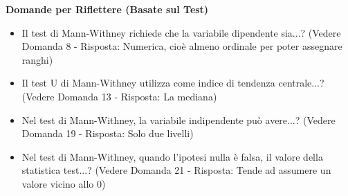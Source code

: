 \documentclass[12pt, a4paper]{article}
\newenvironment{reflectionbox}{%
    \medskip
    \begin{framed}\par\noindent
    \textbf{\color{boxtitlecolor}Domande per Riflettere (Basate sul Test)} \par
    \begin{itemize}[leftmargin=*, label=$\blacktriangleright$]
}{%
    \end{itemize}\par
    \end{framed}
    \medskip
}
\begin{document}
\begin{reflectionbox}
    \item Il test di Mann-Withney richiede che la variabile dipendente sia...? (Vedere Domanda 8 - Risposta: Numerica, cioè almeno ordinale per poter assegnare ranghi)
    \item Il test U di Mann-Withney utilizza come indice di tendenza centrale...? (Vedere Domanda 13 - Risposta: La mediana)
    \item Nel test di Mann-Withney, la variabile indipendente può avere...? (Vedere Domanda 19 - Risposta: Solo due livelli)
    \item Nel test di Mann-Withney, quando l'ipotesi nulla è falsa, il valore della statistica test...? (Vedere Domanda 21 - Risposta: Tende ad assumere un valore vicino allo 0)
\end{reflectionbox}
\end{document}
